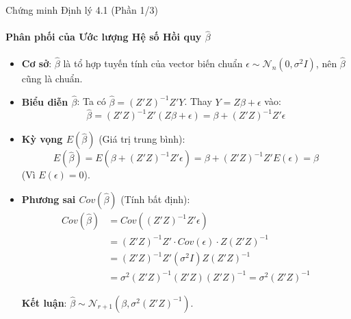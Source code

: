 \begin{frame}{Chứng minh Định lý 4.1 (Phần 1/3)}
    \framesubtitle{Phân phối của Ước lượng Hệ số Hồi quy $\hat{\beta}$}

     \begin{itemize}
        \item \textbf{Cơ sở}: $\hat{\beta}$ là tổ hợp tuyến tính của vector biến chuẩn $\epsilon \sim \mathcal{N}_n(0, \sigma^2 I)$, nên $\hat{\beta}$ cũng là chuẩn.
        \item \textbf{Biểu diễn $\hat{\beta}$}: Ta có $\hat{\beta} = (Z'Z)^{-1}Z'Y$. Thay $Y = Z\beta + \epsilon$ vào:
        \[
            \hat{\beta} = (Z'Z)^{-1}Z'(Z\beta + \epsilon) = \beta + (Z'Z)^{-1}Z'\epsilon
        \]

        \item \textbf{Kỳ vọng $E(\hat{\beta})$} (Giá trị trung bình):
        \[
            E(\hat{\beta}) = E\left(\beta + (Z'Z)^{-1}Z'\epsilon\right) = \beta + (Z'Z)^{-1}Z'E(\epsilon) = \beta
        \]
        (Vì $E(\epsilon) = 0$).
        \item \textbf{Phương sai $Cov(\hat{\beta})$} (Tính bất định):
        \begin{align*}
            Cov(\hat{\beta}) &= Cov\left((Z'Z)^{-1}Z'\epsilon\right) \\
            &= (Z'Z)^{-1}Z' \cdot Cov(\epsilon) \cdot Z(Z'Z)^{-1} \\
            &= (Z'Z)^{-1}Z' (\sigma^2 I) Z(Z'Z)^{-1} \\
            &= \sigma^2 (Z'Z)^{-1} (Z'Z) (Z'Z)^{-1} = \sigma^2 (Z'Z)^{-1}
        \end{align*}
        
        \textbf{Kết luận}: $\hat{\beta} \sim \mathcal{N}_{r+1}(\beta, \sigma^2 (Z'Z)^{-1})$.
    \end{itemize}
\end{frame}

